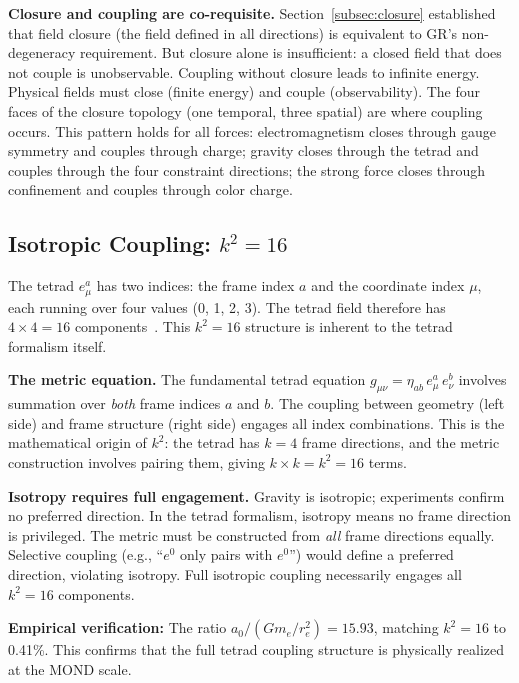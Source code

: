 \documentclass[aps,prd,preprint,superscriptaddress,showpacs,preprintnumbers,amsmath,amssymb,nofootinbib]{revtex4-2}
\begin{document}
\textbf{Closure and coupling are co-requisite.} Section~\ref{subsec:closure} established that field closure (the field defined in all directions) is equivalent to GR's non-degeneracy requirement. But closure alone is insufficient: a closed field that does not couple is unobservable. Coupling without closure leads to infinite energy. Physical fields must close (finite energy) and couple (observability). The four faces of the closure topology (one temporal, three spatial) are where coupling occurs. This pattern holds for all forces: electromagnetism closes through gauge symmetry and couples through charge; gravity closes through the tetrad and couples through the four constraint directions; the strong force closes through confinement and couples through color charge.

\subsection{Isotropic Coupling: \texorpdfstring{$k^2 = 16$}{k² = 16}}
\label{subsec:coupling}

The tetrad $e^a_\mu$ has two indices: the frame index $a$ and the coordinate index $\mu$, each running over four values (0, 1, 2, 3). The tetrad field therefore has $4 \times 4 = 16$ components~\cite{mtw1973}. This $k^2 = 16$ structure is inherent to the tetrad formalism itself.

\textbf{The metric equation.} The fundamental tetrad equation $g_{\mu\nu} = \eta_{ab}\, e^a_\mu\, e^b_\nu$ involves summation over \emph{both} frame indices $a$ and $b$. The coupling between geometry (left side) and frame structure (right side) engages all index combinations. This is the mathematical origin of $k^2$: the tetrad has $k=4$ frame directions, and the metric construction involves pairing them, giving $k \times k = k^2 = 16$ terms.

\textbf{Isotropy requires full engagement.} Gravity is isotropic; experiments confirm no preferred direction. In the tetrad formalism, isotropy means no frame direction is privileged. The metric must be constructed from \emph{all} frame directions equally. Selective coupling (e.g., ``$e^0$ only pairs with $e^0$'') would define a preferred direction, violating isotropy. Full isotropic coupling necessarily engages all $k^2 = 16$ components.

\textbf{Empirical verification:} The ratio $a_0/(Gm_e/r_e^2) = 15.93$, matching $k^2 = 16$ to 0.41\%. This confirms that the full tetrad coupling structure is physically realized at the MOND scale.
\end{document}
